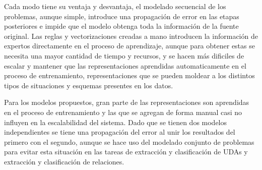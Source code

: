 \documentclass[a4paper,11pt,twocolumn,twoside]{article}
\begin{document}

Cada modo tiene su ventaja y desvantaja, el modelado secuencial de los problemas, aunque simple, introduce
una propagación de error en las etapas posteriores e impide que el modelo obtenga toda la información de
la fuente original. Las reglas y vectorizaciones creadas a mano introducen la información de expertos 
directamente en el proceso de aprendizaje, aunque para obtener estas se necesita una mayor cantidad 
de tiempo y recursos, y se hacen más dificiles de escalar y mantener que las representaciones aprendidas
automaticamente en el proceso de entrenamiento, representaciones que se pueden moldear a los distintos
tipos de situaciones y esquemas presentes en los datos.

Para los modelos propuestos, gran parte de las representaciones son aprendidas en el proceso de 
entrenamiento y las que se agregan de forma manual casi no influyen en la escalabilidad del sistema.
Dado que se tienen dos modelos independientes se tiene una propagación del error al unir los resultados 
del primero con el segundo, aunque se hace uso del modelado conjunto de problemas para evitar esta 
situación en las tareas de extracción y clasificación de UDAs y extracción y clasificación de relaciones.

\end{document}
